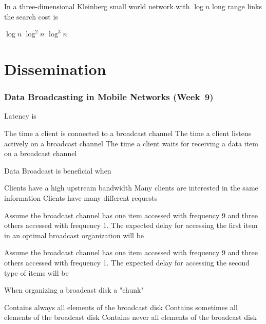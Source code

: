 \documentclass[12pt,a4paper]{exam} %
\begin{document}
\begin{flushleft}
\begin{multicols*}{2}
\begin{questions}
\question In a three-dimensional Kleinberg small world network with $\log n$ long range links the search cost is
\begin{checkboxes}
\CorrectChoice $\log n$
\choice $\log^2 n$
\choice $\log^3 n$
\end{checkboxes}

\part{Dissemination}
\section{Data Broadcasting in Mobile Networks (Week~9)}

\question Latency is
\begin{checkboxes}
\choice The time a client is connected to a broadcast channel
\choice The time a client listens actively on a broadcast channel
\CorrectChoice The time a client waits for receiving a data item on a broadcast channel 
\end{checkboxes}

\question Data Broadcast is beneficial when
\begin{checkboxes}
\choice Clients have a high upstream bandwidth
\CorrectChoice Many clients are interested in the same information
\choice Clients have many different requests
\end{checkboxes}

\question Assume the broadcast channel has one item accessed with frequency 9 and three others accessed with frequency 1. The expected delay for accessing the first item in an optimal broadcast organization will be
\begin{checkboxes}
\end{checkboxes}

\question Assume the broadcast channel has one item accessed with frequency 9 and three others accessed with frequency 1. The expected delay for accessing the second type of items will be
\begin{checkboxes}
\end{checkboxes}

\question When organizing a broadcast disk a "chunk"
\begin{checkboxes}
\choice Contains always all elements of the broadcast disk
\CorrectChoice Contains sometimes all elements of the broadcast disk
\choice Contains never all elements of the broadcast disk
\end{checkboxes}


\end{questions}
\end{multicols*}
\end{flushleft}
\end{document}
